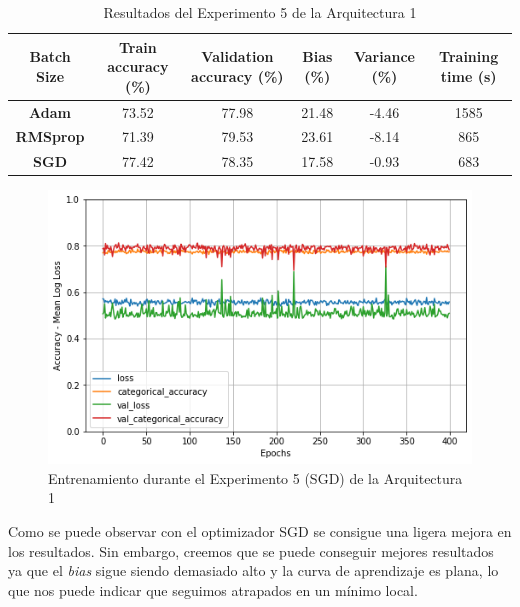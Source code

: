 \documentclass{article}
\begin{document}
    
   
   \begin{table}[!h]
				\begin{center}
					\begin{tabular}{ c | c | c | c | c | c |}
						 \textbf{Batch Size} & \textbf{Train accuracy (\%)} & \textbf{Validation accuracy (\%)} & \textbf{Bias (\%)} & \textbf{Variance (\%)} & \textbf{Training time (s)} \\ \hline
						\textbf{Adam } & 73.52   &77.98 &  21.48 & -4.46  &1585    \\ \hline
                        \textbf{RMSprop } & 71.39   &79.53  & 23.61  & -8.14  &  865   \\ \hline
                        \textbf{SGD} &  77.42   &  78.35& 17.58 & -0.93 &   683  \\ \hline
					\end{tabular}
					\caption{Resultados del Experimento 5 de la Arquitectura 1}
					\label{tab:res-a2-e5}
				\end{center}
			\end{table}
   
   \begin{figure}[!h]
				\begin{center}
					\includegraphics[scale=0.5]{Images/tr-a6-e5(SGD).png}		
					\caption{Entrenamiento durante el Experimento 5 (SGD) de la Arquitectura 1}	
					\label{tab:tr-a6-e5}
				\end{center}
			\end{figure}
   
   Como se puede observar con el optimizador SGD se consigue una ligera mejora en los resultados. Sin embargo, creemos que se puede conseguir mejores resultados ya que el \textit{bias} sigue siendo demasiado alto y la curva de aprendizaje es plana, lo que nos puede indicar que seguimos atrapados en un mínimo local. 
\end{document}
